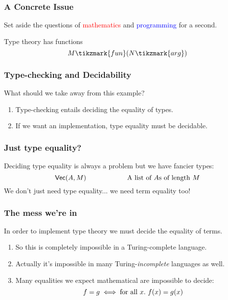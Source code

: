 \documentclass[usenames,dvipsnames,aspectratio=169,12pt]{beamer}
\begin{document}
\begin{frame}
  \frametitle{A Concrete Issue}
  Set aside the questions of \textcolor{Red}{mathematics} and \textcolor{Blue}{programming} for a
  second.
  \bigskip

  Type theory has functions
  \[
    \App{M\tikzmark{fun}}{N\tikzmark{arg}}
  \]
\end{frame}

\begin{frame}
  \frametitle{Type-checking and Decidability}
  What should we take away from this example?
  \begin{enumerate}
  \item Type-checking entails deciding the equality of types.
  \item If we want an implementation, type equality must be decidable.
  \end{enumerate}
\end{frame}

\begin{frame}
  \frametitle{Just type equality?}
  Deciding type equality is always a problem but we have fancier types:
  \[
    \mathsf{Vec}(A, M) \qquad\quad\qquad\quad\text{A list of $A$s of length $M$}
  \]
  \pause
  We don't just need type equality... we need term equality too!
\end{frame}

\begin{frame}
  \frametitle{The mess we're in}
  In order to implement type theory we must decide the equality of terms.
  \begin{enumerate}
  \item So this is completely impossible in a Turing-complete language.
  \item Actually it's impossible in many Turing-\emph{incomplete} languages as well.
  \item Many equalities we expect mathematical are impossible to decide:
    \[
      f = g \iff \text{for all } x.\ f(x) = g(x)
    \]
  \end{enumerate}
\end{frame}
\end{document}
